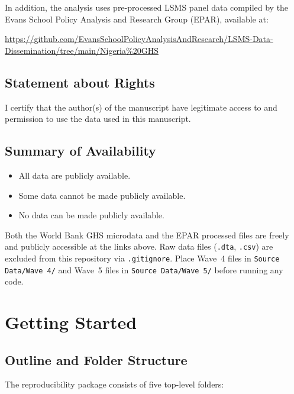 \documentclass[11pt]{article}
\begin{document}
In addition, the analysis uses pre-processed LSMS panel data compiled by the
Evans School Policy Analysis and Research Group (EPAR), available at:
\begin{center}
\url{https://github.com/EvansSchoolPolicyAnalysisAndResearch/LSMS-Data-Dissemination/tree/main/Nigeria\%20GHS}
\end{center}

\subsection{Statement about Rights}

I certify that the author(s) of the manuscript have legitimate access to and
permission to use the data used in this manuscript.

\subsection{Summary of Availability}

\begin{itemize}[label=\Square]
    \item[\CheckedBox] All data are publicly available.
    \item Some data cannot be made publicly available.
    \item No data can be made publicly available.
\end{itemize}

Both the World Bank GHS microdata and the EPAR processed files are freely and
publicly accessible at the links above. Raw data files (\texttt{.dta},
\texttt{.csv}) are excluded from this repository via \texttt{.gitignore}.
Place Wave~4 files in \texttt{Source Data/Wave 4/} and Wave~5 files in
\texttt{Source Data/Wave 5/} before running any code.

\section{Getting Started}

\subsection{Outline and Folder Structure}

The reproducibility package consists of five top-level folders:
\end{document}
